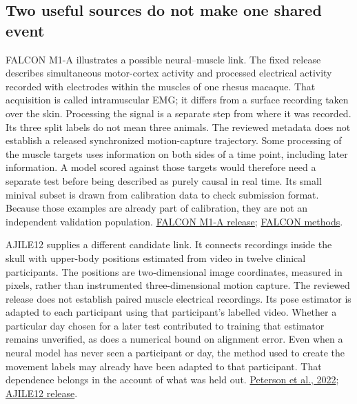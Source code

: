 \subsection{Two useful sources do not make one shared event}

FALCON M1-A illustrates a possible neural--muscle link. The fixed release describes simultaneous motor-cortex activity and processed electrical activity recorded with electrodes within the muscles of one rhesus macaque. That acquisition is called intramuscular EMG; it differs from a surface recording taken over the skin. Processing the signal is a separate step from where it was recorded. Its three split labels do not mean three animals. The reviewed metadata does not establish a released synchronized motion-capture trajectory. Some processing of the muscle targets uses information on both sides of a time point, including later information. A model scored against those targets would therefore need a separate test before being described as purely causal in real time. Its small minival subset is drawn from calibration data to check submission format. Because those examples are already part of calibration, they are not an independent validation population. \href{https://doi.org/10.48324/dandi.000941/0.241029.1405}{FALCON M1-A release}; \href{https://papers.nips.cc/paper_files/paper/2024/file/8c2e6bb15be1894b8fb4e0f9bcad1739-Paper-Datasets_and_Benchmarks_Track.pdf}{FALCON methods}.

AJILE12 supplies a different candidate link. It connects recordings inside the skull with upper-body positions estimated from video in twelve clinical participants. The positions are two-dimensional image coordinates, measured in pixels, rather than instrumented three-dimensional motion capture. The reviewed release does not establish paired muscle electrical recordings. Its pose estimator is adapted to each participant using that participant's labelled video. Whether a particular day chosen for a later test contributed to training that estimator remains unverified, as does a numerical bound on alignment error. Even when a neural model has never seen a participant or day, the method used to create the movement labels may already have been adapted to that participant. That dependence belongs in the account of what was held out. \href{https://doi.org/10.1038/s41597-022-01280-y}{Peterson et al., 2022}; \href{https://doi.org/10.48324/dandi.000055/0.220127.0436}{AJILE12 release}.

